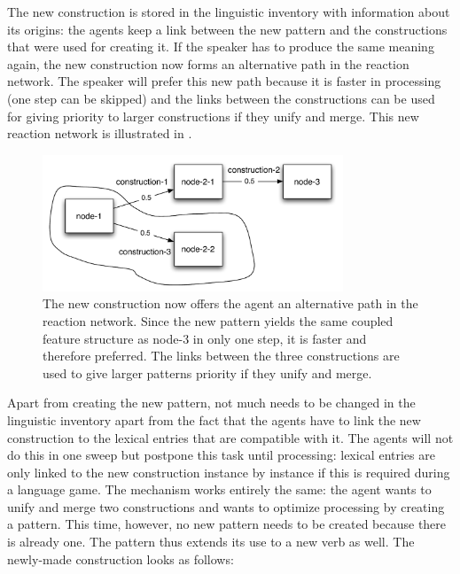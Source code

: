 \newpage
The new construction is stored in the linguistic inventory with information about its origins: the agents keep a link between the new pattern and the constructions that were used for creating it. If the speaker has to produce the same meaning again, the new construction now forms an alternative path in the reaction network. The speaker will prefer this new path because it is faster in processing (one step can be skipped) and the links between the constructions can be used for giving priority to larger constructions if they unify and merge. This new reaction network is illustrated in .

\begin{figure}
\centerline{\includegraphics[width=0.8\textwidth]{Chapter4/figs/reaction2}}
  \caption[A reaction network with the new pattern]{The new construction now offers the agent an alternative path in the reaction network. Since the new pattern yields the same coupled feature structure as node-3 in only one step, it is faster and therefore preferred. The links between the three constructions are used to give larger patterns priority if they unify and merge.}
   \label{f:reaction2}
\end{figure}

Apart from creating the new pattern, not much needs to be changed in the linguistic inventory apart from the fact that the agents have to link the new construction to the lexical entries that are compatible with it. The agents will not do this in one sweep but postpone this task until processing: lexical entries are only linked to the new construction instance by instance if this is required during a language game. The mechanism works entirely the same: the agent wants to unify and merge two constructions and wants to optimize processing by creating a pattern. This time, however, no new pattern needs to be created because there is already one. The pattern thus extends its use to a new verb as well. The newly-made construction looks as follows:
\largerpage[-1]

